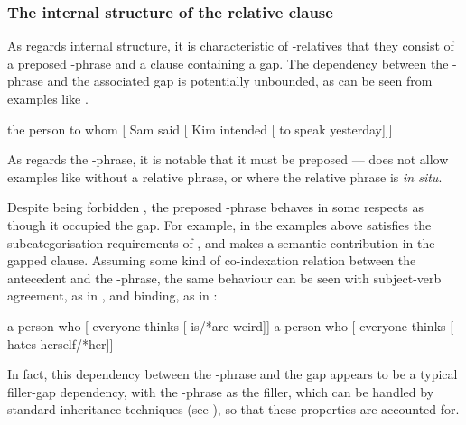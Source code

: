 \documentclass[output=paper
                ,modfonts
                ,nonflat
	        ,collection
	        ,collectionchapter
	        ,collectiontoclongg
 	        ,biblatex
                ,babelshorthands
                ,newtxmath
                ,draftmode
                ,colorlinks, citecolor=brown
]{./langsci/langscibook}
\begin{document}
\subsubsection{The internal structure of the relative clause}
\label{sec:rc-intern-struct-relat}
As regards internal structure, it is characteristic of -relatives that
they consist of a preposed -phrase and a clause containing a gap.
The dependency between the -phrase and the associated gap is potentially
unbounded, as can be seen from examples like .
\begin{exe}\ex\label{x:rc-11}
  the person to whom [ Sam said [ Kim intended [ to speak \trace yesterday]]]
\end{exe}
As regards the -phrase, it is notable that it must be preposed --- 
does not allow examples like  without a relative phrase, or  where
the relative phrase is \emph{in situ}.
\begin{exe}\ex\begin{xlist}\label{x:rc-8}
\end{xlist}\end{exe}
Despite being forbidden , the preposed -phrase behaves in some
respects as though it occupied the gap. For example, in the  examples above 
satisfies the subcategorisation requirements of , and makes a semantic
contribution in the gapped clause.  Assuming some kind of co-indexation relation
between the antecedent and the -phrase, the same behaviour can be seen with
subject-verb agreement, as in , and binding, as in :
\begin{exe}\ex\begin{xlist}
  \ex\label{x:rc-166} a person who [ everyone thinks [ \trace is/*are weird]]
  \ex\label{x:rc-167} a person who [ everyone thinks [ \trace hates herself/*her]]
\end{xlist}\end{exe}
In fact, this dependency between the -phrase and the gap appears to be a typical
filler-gap dependency, with the -phrase as the filler,  which can be handled by
standard  inheritance techniques (see ), so that these
properties are accounted for.
\end{document}
